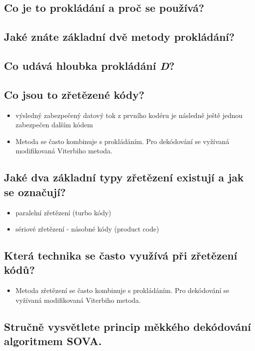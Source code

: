 \subsection{Co je to prokládání a proč se používá?}

\subsection{Jaké znáte základní dvě metody prokládání?}

\subsection{Co udává hloubka prokládání \textit{D}?}

\subsection{Co jsou to zřetězené kódy?}
\begin{itemize}
    \item výsledný zabezpečený datový tok z prvního kodéru je následně ještě jednou zabezpečen dalším kódem
    \item  Metoda se často kombinuje s prokládáním. Pro dekódování se vyžívaná modifikovaná Viterbiho metoda.
\end{itemize}

\subsection{Jaké dva základní typy zřetězení existují a jak se označují?}
\begin{itemize}
    \item paralelní zřetězení (turbo kódy)
    \item sériové zřetězení - násobné kódy (product code)
\end{itemize}

\subsection{Která technika se často využívá při zřetězení kódů?}
\begin{itemize}
    \item Metoda zřetězení se často kombinuje s prokládáním. Pro dekódování se vyžívaná modifikovaná Viterbiho metoda.
\end{itemize}

\subsection{Stručně vysvětlete princip měkkého dekódování algoritmem SOVA.}
